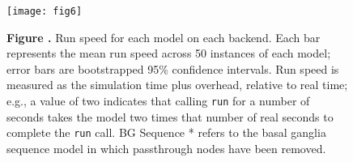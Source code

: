 \documentclass{frontiersSCNS}
\providecommand{\DIFaddbeginFL}{} %
\providecommand{\DIFaddendFL}{} %
\providecommand{\DIFdelbeginFL}{} %
\providecommand{\DIFdelendFL}{} %
\begin{document}
\begin{figure}[!ht]
\begin{center}
  \DIFdelbeginFL %
\DIFdelendFL \DIFaddbeginFL \texttt{[image: fig6]}
\DIFaddendFL \end{center}
\textbf{\label{fig:06} Figure .}
       {Run speed for each model on each backend. Each bar represents
         the mean run speed across 50 instances of each model;
         error bars are bootstrapped 95\% confidence intervals.
         Run speed is measured as the simulation time plus overhead,
         relative to real time; e.g., a value of two indicates that
         calling \texttt{run} for a number of seconds takes
         the model two times that number of real seconds to complete the
         \texttt{run} call.
         BG Sequence * refers to the basal ganglia sequence model
         in which passthrough nodes have been removed.}

\end{figure}
\end{document}
